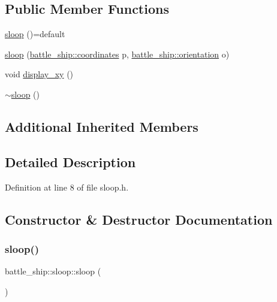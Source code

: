 \subsection*{Public Member Functions}
\begin{DoxyCompactItemize}
\item 
\hyperlink{classbattle__ship_1_1sloop_a1131cdd9568e94d64637fbbf7ca5e47a}{sloop} ()=default
\item 
\hyperlink{classbattle__ship_1_1sloop_a3cf36ea46d4623283e9156683753df18}{sloop} (\hyperlink{structbattle__ship_1_1coordinates}{battle\+\_\+ship\+::coordinates} p, \hyperlink{namespacebattle__ship_aed87488f0a73f0d0679fe343fb61c784}{battle\+\_\+ship\+::orientation} o)
\item 
void \hyperlink{classbattle__ship_1_1sloop_a4448d666d4d7a4524618ad88e4dc802e}{display\+\_\+xy} ()
\item 
\hyperlink{classbattle__ship_1_1sloop_a576cf3dbf2293c70e745ab561eae01c4}{$\sim$sloop} ()
\end{DoxyCompactItemize}
\subsection*{Additional Inherited Members}


\subsection{Detailed Description}


Definition at line 8 of file sloop.\+h.



\subsection{Constructor \& Destructor Documentation}
\mbox{\label{classbattle__ship_1_1sloop_a1131cdd9568e94d64637fbbf7ca5e47a}} 
\subsubsection{\texorpdfstring{sloop()}{sloop()}\hspace{0.1cm}{\footnotesize\ttfamily [1/2]}}
{\footnotesize\ttfamily battle\+\_\+ship\+::sloop\+::sloop (\begin{DoxyParamCaption}{ }\end{DoxyParamCaption})\hspace{0.3cm}{\ttfamily [default]}}

